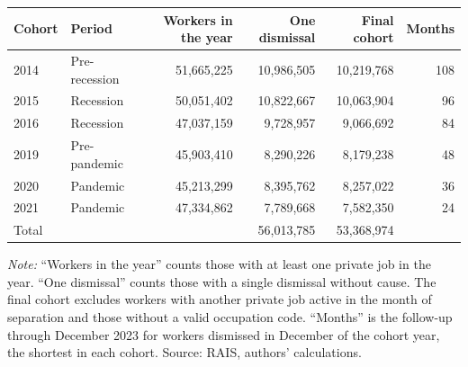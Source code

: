 {\small
\begin{threeparttable}
\begin{tabular}{llrrrr}
\toprule
Cohort & Period & Workers in the year & One dismissal & Final cohort & Months \\
\midrule
2014 & Pre-recession & 51,665,225 & 10,986,505 & 10,219,768 & 108 \\
2015 & Recession & 50,051,402 & 10,822,667 & 10,063,904 & 96 \\
2016 & Recession & 47,037,159 & 9,728,957 & 9,066,692 & 84 \\
2019 & Pre-pandemic & 45,903,410 & 8,290,226 & 8,179,238 & 48 \\
2020 & Pandemic & 45,213,299 & 8,395,762 & 8,257,022 & 36 \\
2021 & Pandemic & 47,334,862 & 7,789,668 & 7,582,350 & 24 \\
\addlinespace[3pt]
Total &  &  & 56,013,785 & 53,368,974 &  \\
\bottomrule
\end{tabular}
\begin{tablenotes}[flushleft]\footnotesize
\item \textit{Note:} ``Workers in the year'' counts those with at least one private job in the year. ``One dismissal'' counts those with a single dismissal without cause. The final cohort excludes workers with another private job active in the month of separation and those without a valid occupation code. ``Months'' is the follow-up through December 2023 for workers dismissed in December of the cohort year, the shortest in each cohort. Source: RAIS, authors' calculations.
\end{tablenotes}
\end{threeparttable}
}
